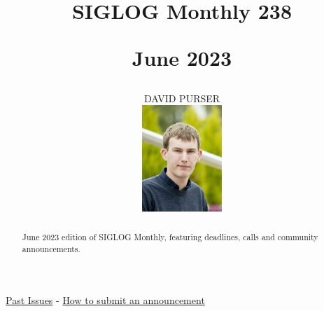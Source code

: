 \documentclass[prodmode,acmtecs]{acmsmall} %
\newcounter{colstart}
\begin{document}
\setcounter{colstart}{\thepage}

\title{{\huge\sc SIGLOG Monthly 238}

 June 2023}
\author{DAVID PURSER
\vspace*{-2.6cm}\begin{flushright}\includegraphics[width=30mm]{dp}\end{flushright}
}

\begin{abstract}
June 2023 edition of SIGLOG Monthly, featuring deadlines, calls and community announcements.
\end{abstract}


\maketitlee

\href{https://lics.siglog.org/newsletters/}{Past Issues}
 - 
\href{https://lics.siglog.org/newsletters/inst.html}{How to submit an announcement}
\end{document}
